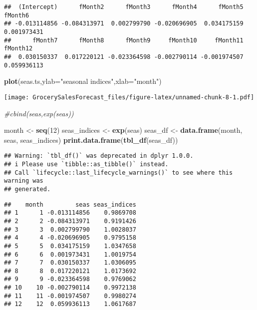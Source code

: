 \documentclass[
]{article}
\newenvironment{Shaded}{\begin{snugshade}}{\end{snugshade}}
\newcommand{\AttributeTok}[1]{\textcolor[rgb]{0.13,0.29,0.53}{#1}}
\newcommand{\CommentTok}[1]{\textcolor[rgb]{0.56,0.35,0.01}{\textit{#1}}}
\newcommand{\DecValTok}[1]{\textcolor[rgb]{0.00,0.00,0.81}{#1}}
\newcommand{\FunctionTok}[1]{\textcolor[rgb]{0.13,0.29,0.53}{\textbf{#1}}}
\newcommand{\NormalTok}[1]{#1}
\newcommand{\OtherTok}[1]{\textcolor[rgb]{0.56,0.35,0.01}{#1}}
\newcommand{\StringTok}[1]{\textcolor[rgb]{0.31,0.60,0.02}{#1}}
\begin{document}
\begin{verbatim}
##  (Intercept)      fMonth2      fMonth3      fMonth4      fMonth5      fMonth6 
## -0.013114856 -0.084313971  0.002799790 -0.020696905  0.034175159  0.001973431 
##      fMonth7      fMonth8      fMonth9     fMonth10     fMonth11     fMonth12 
##  0.030150337  0.017220121 -0.023364598 -0.002790114 -0.001974507  0.059936113
\end{verbatim}

\begin{Shaded}
\begin{Highlighting}[]
\FunctionTok{plot}\NormalTok{(seas.ts,}\AttributeTok{ylab=}\StringTok{"seasonal indices"}\NormalTok{,}\AttributeTok{xlab=}\StringTok{"month"}\NormalTok{)}
\end{Highlighting}
\end{Shaded}

\texttt{[image: GrocerySalesForecast\_files/figure-latex/unnamed-chunk-8-1.pdf]}

\begin{Shaded}
\begin{Highlighting}[]
\CommentTok{\#cbind(seas,exp(seas))}

\NormalTok{month }\OtherTok{\textless{}{-}} \FunctionTok{seq}\NormalTok{(}\DecValTok{12}\NormalTok{)}
\NormalTok{seas\_indices }\OtherTok{\textless{}{-}} \FunctionTok{exp}\NormalTok{(seas)}
\NormalTok{seas\_df }\OtherTok{\textless{}{-}} \FunctionTok{data.frame}\NormalTok{(month, seas, seas\_indices)}
\FunctionTok{print.data.frame}\NormalTok{(}\FunctionTok{tbl\_df}\NormalTok{(seas\_df))}
\end{Highlighting}
\end{Shaded}

\begin{verbatim}
## Warning: `tbl_df()` was deprecated in dplyr 1.0.0.
## i Please use `tibble::as_tibble()` instead.
## Call `lifecycle::last_lifecycle_warnings()` to see where this warning was
## generated.
\end{verbatim}

\begin{verbatim}
##    month         seas seas_indices
## 1      1 -0.013114856    0.9869708
## 2      2 -0.084313971    0.9191426
## 3      3  0.002799790    1.0028037
## 4      4 -0.020696905    0.9795158
## 5      5  0.034175159    1.0347658
## 6      6  0.001973431    1.0019754
## 7      7  0.030150337    1.0306095
## 8      8  0.017220121    1.0173692
## 9      9 -0.023364598    0.9769062
## 10    10 -0.002790114    0.9972138
## 11    11 -0.001974507    0.9980274
## 12    12  0.059936113    1.0617687
\end{verbatim}
\end{document}
